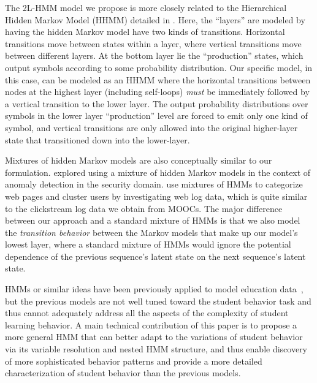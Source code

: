 The 2L-HMM model we propose is more closely related to the Hierarchical
Hidden Markov Model (HHMM) detailed in \citet{Fine:1998:ML}. Here, the
``layers'' are modeled by having the hidden Markov model have two kinds of
transitions.  Horizontal transitions move between states within a layer,
where vertical transitions move between different layers. At the bottom
layer lie the ``production'' states, which output symbols according to some
probability distribution. Our specific model, in this case, can be modeled as
an HHMM where the horizontal transitions between nodes at the highest layer
(including self-loops) \emph{must} be immediately followed by a vertical
transition to the lower layer. The output probability distributions over
symbols in the lower layer ``production'' level are forced to emit only one
kind of symbol, and vertical transitions are only allowed into the original
higher-layer state that transitioned down into the lower-layer.

Mixtures of hidden Markov models are also conceptually similar to our
formulation. \citet{Song:2009:NDSS} explored using a mixture of hidden
Markov models in the context of anomaly detection in the security domain.
\citet{Ypma:2002:Springer} use mixtures of HMMs to categorize web pages and
cluster users by investigating web log data, which is quite similar to the
clickstream log data we obtain from MOOCs. The major difference between
our approach and a standard mixture of HMMs is that we also model the
\emph{transition behavior} between the Markov models that make up our
model's lowest layer, where a standard mixture of HMMs would ignore the
potential dependence of the previous sequence's latent state on the next
sequence's latent state.

HMMs or similar ideas have been previously applied to model education
data~\cite{Shih:2010:EDM,Kizilcec:2013:LAK,Davis:2016:EDM}, but the
previous models are not well tuned toward the student behavior task and
thus cannot adequately address all the aspects of the complexity of student
learning behavior.  A main technical contribution of this paper is to
propose a more general HMM that can better adapt to the variations of
student behavior via its variable resolution and nested HMM structure, and
thus enable discovery of more sophisticated behavior patterns and provide
a more detailed characterization of student behavior than the previous
models.

